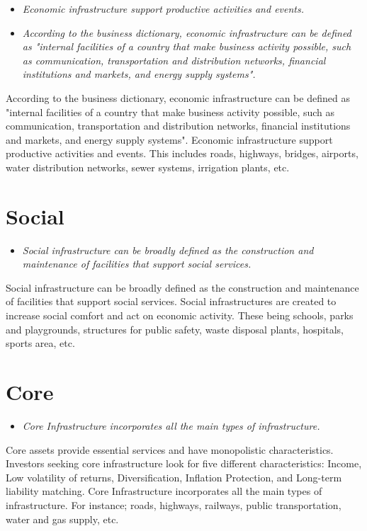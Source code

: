 \begin{itemize}
\item
  \emph{Economic infrastructure support productive activities and
  events.}
\item
  \emph{According to the business dictionary, economic infrastructure
  can be defined as "internal facilities of a country that make business
  activity possible, such as communication, transportation and
  distribution networks, financial institutions and markets, and energy
  supply systems".}
\end{itemize}

According to the business dictionary, economic infrastructure can be
defined as "internal facilities of a country that make business activity
possible, such as communication, transportation and distribution
networks, financial institutions and markets, and energy supply
systems". Economic infrastructure support productive activities and
events. This includes roads, highways, bridges, airports, water
distribution networks, sewer systems, irrigation plants, etc.

\section{Social}\label{social}

\begin{itemize}
\item
  \emph{Social infrastructure can be broadly defined as the construction
  and maintenance of facilities that support social services.}
\end{itemize}

Social infrastructure can be broadly defined as the construction and
maintenance of facilities that support social services. Social
infrastructures are created to increase social comfort and act on
economic activity. These being schools, parks and playgrounds,
structures for public safety, waste disposal plants, hospitals, sports
area, etc.

\section{Core}\label{core}

\begin{itemize}
\item
  \emph{Core Infrastructure incorporates all the main types of
  infrastructure.}
\end{itemize}

Core assets provide essential services and have monopolistic
characteristics. Investors seeking core infrastructure look for five
different characteristics: Income, Low volatility of returns,
Diversification, Inflation Protection, and Long-term liability matching.
Core Infrastructure incorporates all the main types of infrastructure.
For instance; roads, highways, railways, public transportation, water
and gas supply, etc.

